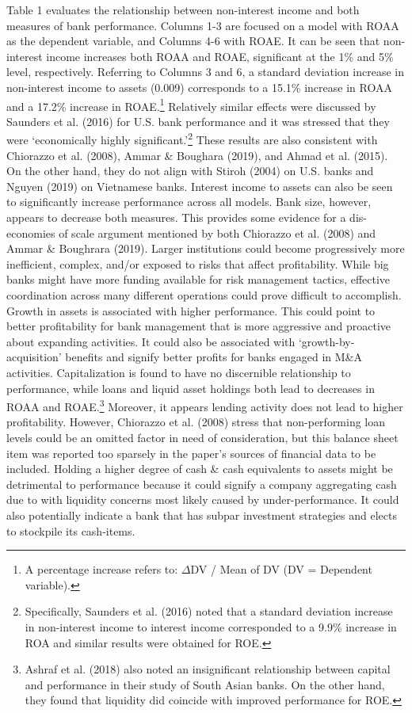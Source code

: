 \documentclass[10pt]{article} %
\begin{document}
Table 1 evaluates the relationship between non-interest income and both measures of bank performance. Columns 1-3 are focused on a model with ROAA as the dependent variable, and Columns 4-6 with ROAE. It can be seen that non-interest income increases both ROAA and ROAE, significant at the 1\% and 5\% level, respectively. Referring to Columns 3 and 6, a standard deviation increase in non-interest income to assets (0.009) corresponds to a 15.1\% increase in ROAA and a 17.2\% increase in ROAE.\footnote{A percentage increase refers to: $\Delta$DV / Mean of DV (DV = Dependent variable).} Relatively similar effects were discussed by Saunders et al. (2016) for U.S. bank performance and it was stressed that they were `economically highly significant.'\footnote{Specifically, Saunders et al. (2016) noted that a standard deviation increase in non-interest income to interest income corresponded to a 9.9\% increase in ROA and similar results were obtained for ROE.} These results are also consistent with Chiorazzo et al. (2008), Ammar \& Boughara (2019), and Ahmad et al. (2015). On the other hand, they do not align with Stiroh (2004) on U.S. banks and Nguyen (2019) on Vietnamese banks. Interest income to assets can also be seen to significantly increase performance across all models. Bank size, however, appears to decrease both measures. This provides some evidence for a dis-economies of scale argument mentioned by both Chiorazzo et al. (2008) and Ammar \& Boughrara (2019). Larger institutions could become progressively more inefficient, complex, and/or exposed to risks that affect profitability. While big banks might have more funding available for risk management tactics, effective coordination across many different operations could prove difficult to accomplish. Growth in assets is associated with higher performance. This could point to better profitability for bank management that is more aggressive and proactive about expanding activities. It could also be associated with `growth-by-acquisition' benefits and signify better profits for banks engaged in M\&A activities. Capitalization is found to have no discernible relationship to performance, while loans and liquid asset holdings both lead to decreases in ROAA and ROAE.\footnote{Ashraf et al. (2018) also noted an insignificant relationship between capital and performance in their study of South Asian banks. On the other hand, they found that liquidity did coincide with improved performance for ROE.} Moreover, it appears lending activity does not lead to higher profitability. However, Chiorazzo et al. (2008) stress that non-performing loan levels could be an omitted factor in need of consideration, but this balance sheet item was reported too sparsely in the paper's sources of financial data to be included. Holding a higher degree of cash \& cash equivalents to assets might be detrimental to performance because it could signify a company aggregating cash due to with liquidity concerns most likely caused by under-performance. It could also potentially indicate a bank that has subpar investment strategies and elects to stockpile its cash-items.
\end{document}
